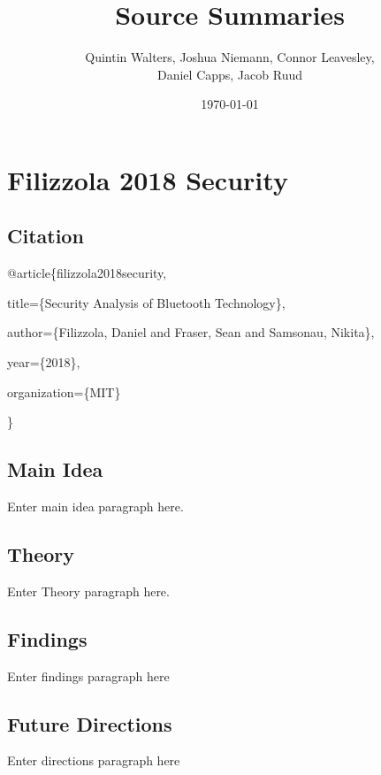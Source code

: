 \documentclass[a4paper,12pt]{article}
\begin{document}
    \title{Source Summaries}
    \author{Quintin Walters, Joshua Niemann, Connor Leavesley,\\
    Daniel Capps, Jacob Ruud}
    \date{\today}
    \maketitle
\break
\tableofcontents
\break

\break
\noindent
\section{Filizzola 2018 Security}
\subsection{Citation}

\noindent
@article\{filizzola2018security,

title=\{Security Analysis of Bluetooth Technology\},

author=\{Filizzola, Daniel and Fraser, Sean and Samsonau, Nikita\},

year=\{2018\},

organization=\{MIT\}

\noindent
\}

\subsection{Main Idea}

\noindent
Enter main idea paragraph here.

\subsection{Theory}

\noindent
Enter Theory paragraph here.

\subsection{Findings}

\noindent
Enter findings paragraph here

\subsection{Future Directions}

\noindent
Enter directions paragraph here
\end{document}

